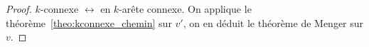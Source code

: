 \begin{mytheo} [Menger]
\begin{proof}
    $k$-connexe $\leftrightarrow$ en $k$-arête connexe.
    On applique le théorème~\ref{theo:kconnexe_chemin} sur $v'$,
    on en déduit le théorème de Menger sur $v$.
  \end{proof}
\end{mytheo}

